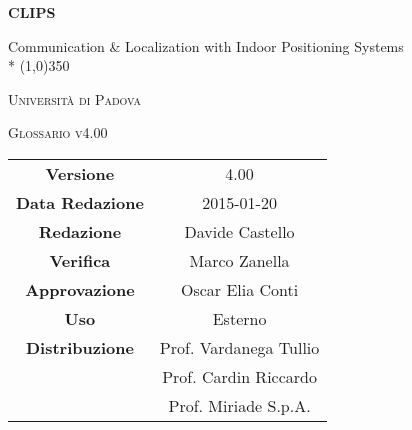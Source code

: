 \documentclass[a4paper]{article}
\author{Zanella Marco}
\date{07/12/2015}
\begin{document}
\begin{titlepage}
	\centering
	{\huge\bfseries CLIPS\par}
	Communication \& Localization with Indoor Positioning Systems \\*
	\line(1,0){350} \\
	{\scshape\LARGE Università di Padova \par}
	\vspace{1cm}
	{\scshape\Large Glossario v4.00\par}
	\logo
	\newpage
		\begin{tabular}{c|c}
			{\hfill \textbf{Versione}} 			& 4.00				\\[1ex]
			{\hfill\textbf{Data Redazione}} 		& 2015-01-20  			\\[1ex]
			{\hfill\textbf{Redazione}} 			& Davide Castello      		\\[1ex]
			{\hfill\textbf{Verifica}} 			& Marco Zanella			\\[1ex]
			{\hfill\textbf{Approvazione}} 		& Oscar Elia Conti		\\[1ex] 
			{\hfill\textbf{Uso}} 				& Esterno			\\[1ex]
			{\hfill\textbf{Distribuzione}} 		& Prof. Vardanega Tullio	\\[1ex]
                                                    			& Prof. Cardin Riccardo		\\[1ex]
                                                    			& Prof. Miriade S.p.A.		\\[1ex]
		\end{tabular}
	\end{titlepage}
	

	
	\pagestyle{mymain}
	\glsaddall
	\printglossary[style=myaltlistgroup, nonumberlist]

\label{LastPage}
\end{document}
